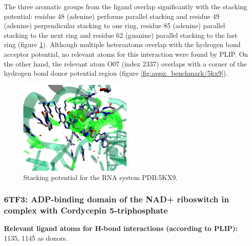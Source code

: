       The three aromatic groups from the ligand overlap significantly with the stacking potential: residue 48 (adenine) performs parallel stacking and residue 49 (adenine) perpendicular stacking to one ring, residue 85 (adenine) parallel stacking to the next ring and residue 62 (guanine) parallel stacking to the last ring (figure \ref{fig:benchmark/5kx9}). Although multiple heteroatoms overlap with the hydrogen bond acceptor potential, no relevant atoms for this interaction were found by PLIP. On the other hand, the relevant atom O07 (index 2337) overlaps with a corner of the hydrogen bond donor potential region (figure \ref{fig:appx_benchmark/5kx9}).

      \begin{figure}[H]
        \centering
        \includegraphics[width=0.5\textwidth]{figures/results/benchmark_rna/5kx9.png}
        \caption{\label{fig:benchmark/5kx9} Stacking potential for the RNA system PDB:5KX9.}
      \end{figure}
    \pagebreak

    \subsubsection{6TF3: ADP-binding domain of the NAD+ riboswitch in complex with Cordycepin 5-triphosphate}
      \textbf{Relevant ligand atoms for H-bond interactions (according to PLIP):} 1135, 1145 as donors.

